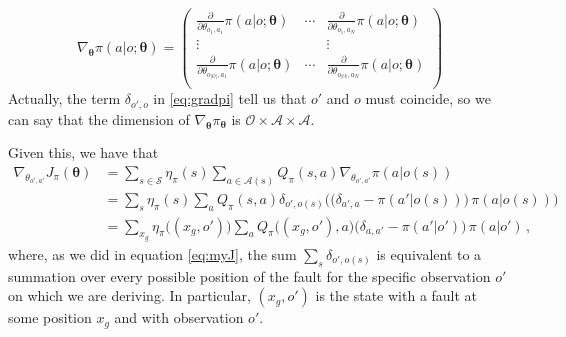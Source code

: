 \begin{equation}
    \nabla_{\boldsymbol \theta} \pi(a|o; \boldsymbol \theta) = \begin{pmatrix}
        \frac{\partial}{\partial \theta_{o_1,a_1}} \pi ( a | o; \boldsymbol \theta )
            & \cdots & \frac{\partial}{\partial \theta_{o_1,a_N}} \pi ( a | o; \boldsymbol \theta ) \\
        \vdots & &
        \vdots \\
        \frac{\partial}{\partial \theta_{o_{|O|},a_1}} \pi ( a | o; \boldsymbol \theta ) 
            & \cdots & \frac{\partial}{\partial \theta_{o_{|O|},a_N}} \pi ( a | o; \boldsymbol \theta ) \\
    \end{pmatrix}
\end{equation}
Actually, the term $\delta_{o',o}$ in \eqref{eq:gradpi} tell us that $o'$ and $o$ must coincide, so we can say that the dimension of $\nabla_{\boldsymbol \theta} \pi_{\boldsymbol \theta}$ is $\mathcal O \times \mathcal A \times \mathcal A$.

Given this, we have that
\begin{equation}
    \begin{aligned}
        \nabla_{\theta_{o',a'}} J_\pi (\boldsymbol \theta)
        &= \sum_{s \in \mathcal S} \eta_\pi(s) \sum_{a \in \mathcal A(s)} Q_\pi(s,a) \nabla_{\theta_{o',a'}} \pi(a|o(s)) \\
        &= \sum_s \eta_\pi(s) \sum_a Q_\pi(s,a) \delta_{o',o(s)} \Big( \big( \delta_{a',a} - \pi(a'|o(s)) \big) \, \pi(a|o(s)) \Big) \\
        &= \sum_{x_g} \eta_\pi \big((x_g, o') \big) \sum_a Q_\pi \big((x_g, o'),a \big) \big( \delta_{a,a'} - \pi(a'|o') \big) \, \pi(a|o') \, ,
    \end{aligned}
    \label{eq:mygradJ}
\end{equation}
where, as we did in equation \eqref{eq:myJ}, the sum $\sum_s \delta_{o', o(s)}$ is equivalent to a summation over every possible position of the fault for the specific observation $o'$ on which we are deriving. In particular, $(x_g, o')$ is the state with a fault at some position $x_g$ and with observation $o'$.

